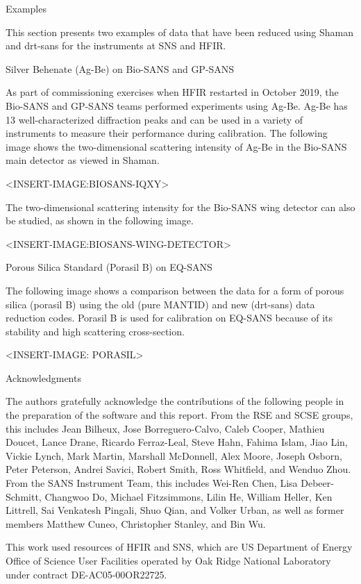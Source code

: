 Examples

This section presents two examples of data that have been reduced using Shaman and drt-sans for the
instruments at SNS and HFIR. 

Silver Behenate (Ag-Be) on Bio-SANS and GP-SANS

As part of commissioning exercises when HFIR restarted in October 2019, the Bio-SANS and GP-SANS
teams performed experiments using Ag-Be. Ag-Be has 13 well-characterized diffraction peaks and can
be used in a variety of instruments to measure their performance during calibration. The following
image shows the two-dimensional scattering intensity of Ag-Be in the Bio-SANS main detector as
viewed in Shaman.

<INSERT-IMAGE:BIOSANS-IQXY>

The two-dimensional scattering intensity for the Bio-SANS wing detector can also be studied, as
shown in the following image.

<INSERT-IMAGE:BIOSANS-WING-DETECTOR>

Porous Silica Standard (Porasil B) on EQ-SANS

The following image shows a comparison between the data for a form of porous silica (porasil B)
using the old (pure MANTID) and new (drt-sans) data reduction codes. Porasil B is used for
calibration on EQ-SANS because of its stability and high scattering cross-section.

<INSERT-IMAGE: PORASIL>

Acknowledgments

The authors gratefully acknowledge the contributions of the following people in the preparation of
the software and this report. From the RSE and SCSE groups, this includes Jean Bilheux, Jose
Borreguero-Calvo, Caleb Cooper, Mathieu Doucet, Lance Drane, Ricardo Ferraz-Leal, Steve Hahn, Fahima
Islam, Jiao Lin, Vickie Lynch, Mark Martin, Marshall McDonnell, Alex Moore, Joseph Osborn, Peter
Peterson, Andrei Savici, Robert Smith, Ross Whitfield, and Wenduo Zhou. From the SANS Instrument
Team, this includes Wei-Ren Chen, Lisa Debeer-Schmitt, Changwoo Do, Michael Fitzsimmons, Lilin He,
William Heller, Ken Littrell, Sai Venkatesh Pingali, Shuo Qian, and Volker Urban, as well as former
members Matthew Cuneo, Christopher Stanley, and Bin Wu.

This work used resources of HFIR and SNS, which are US Department of Energy Office of Science User
Facilities operated by Oak Ridge National Laboratory under contract DE-AC05-00OR22725.




